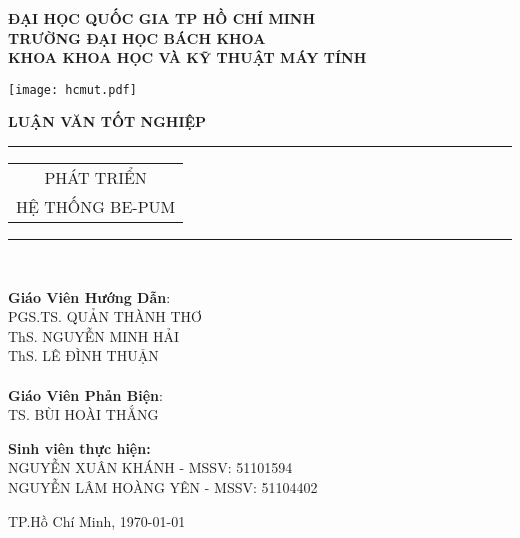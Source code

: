 
\begin{titlepage}


\vspace{-1cm}

\thispagestyle{empty}
\begin{center}
	\bfseries ĐẠI HỌC QUỐC GIA TP HỒ CHÍ MINH \\
	TRƯỜNG ĐẠI HỌC BÁCH KHOA \\
	KHOA KHOA HỌC VÀ KỸ THUẬT MÁY TÍNH\\
\end{center}

\vspace{0.5cm}

\begin{center}
\texttt{[image: hcmut.pdf]}\\[1cm]
\end{center}


\begin{flushleft}
	\Large \bfseries LUẬN VĂN TỐT NGHIỆP \\[0.5cm]
\end{flushleft}
\rule{\textwidth}{1pt}
\begin{center}
\Huge
	\begin{tabular}{@{}c}
		PHÁT TRIỂN\\
		HỆ THỐNG BE-PUM\\[6pt]
	\end{tabular}
\end{center}
\rule{\textwidth}{1pt}\\[1cm]

\hspace{-0.5cm}
\begin{minipage}[t]{0.44\linewidth}
	\textbf{Giáo Viên Hướng Dẫn}: \\
		 PGS.TS. QUẢN THÀNH THƠ\\
		ThS. NGUYỄN MINH HẢI\\
		ThS. LÊ ĐÌNH THUẬN\\\\
	\textbf{Giáo Viên Phản Biện}: \\
		 TS. BÙI HOÀI THẮNG
	\end{minipage}
\begin{minipage}[t]{0.60\linewidth}
	\textbf{Sinh viên thực hiện:}\\
		NGUYỄN XUÂN KHÁNH - MSSV: 51101594\\
		NGUYỄN LÂM HOÀNG YÊN - MSSV: 51104402\\
\end{minipage}

\vspace{1.4cm}

\vfill
\begin{center}
	{TP.Hồ Chí Minh, \today} %
\end{center}
\end{titlepage}
